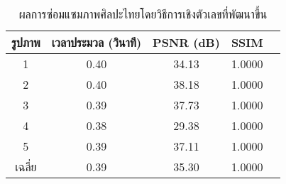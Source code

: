 \begin{table}[H]
    \centering
    \begin{tabular}[ht]{|c|c|c|c|c|}
        \hline
        รูปภาพ &เวลาประมวล  (วินาที) & PSNR (dB) & SSIM \\
        \hline
        1 & 0.40 & 34.13 & 1.0000 \\ 
        2 & 0.40 & 38.18 & 1.0000 \\
        3 &  0.39 & 37.73 & 1.0000 \\
        4 & 0.38  & 29.38  & 1.0000 \\
        5 & 0.39  & 37.11  & 1.0000 \\
        \hline
        เฉลี่ย & 0.39  & 35.30  & 1.0000 \\
        \hline
    \end{tabular}
    \caption{ผลการซ่อมแซมภาพศิลปะไทยโดยวิธีการเชิงตัวเลขที่พัฒนาขึ้น}
    \label{table:ex4-multiresolution}
\end{table}	 